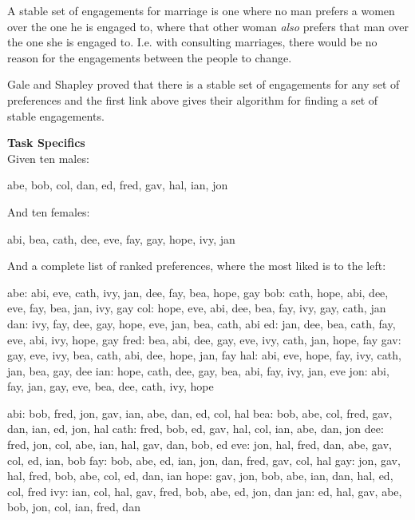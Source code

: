 \begin{itemize}
A stable set of engagements for marriage is one where no man prefers a
women over the one he is engaged to, where that other woman \emph{also}
prefers that man over the one she is engaged to. I.e. with consulting
marriages, there would be no reason for the engagements between the
people to change.

Gale and Shapley proved that there is a stable set of engagements for
any set of preferences and the first link above gives their algorithm
for finding a set of stable engagements.

\pagebreak{}
\textbf{Task Specifics}\\ Given ten males:

\begin{wideverbatim}
   abe, bob, col, dan, ed, fred, gav, hal, ian, jon
\end{wideverbatim}

And ten females:

\begin{wideverbatim}
   abi, bea, cath, dee, eve, fay, gay, hope, ivy, jan
\end{wideverbatim}

And a complete list of ranked preferences, where the most liked is to
the left:

\begin{wideverbatim}
  abe: abi, eve, cath, ivy, jan, dee, fay, bea, hope, gay
  bob: cath, hope, abi, dee, eve, fay, bea, jan, ivy, gay
  col: hope, eve, abi, dee, bea, fay, ivy, gay, cath, jan
  dan: ivy, fay, dee, gay, hope, eve, jan, bea, cath, abi
   ed: jan, dee, bea, cath, fay, eve, abi, ivy, hope, gay
 fred: bea, abi, dee, gay, eve, ivy, cath, jan, hope, fay
  gav: gay, eve, ivy, bea, cath, abi, dee, hope, jan, fay
  hal: abi, eve, hope, fay, ivy, cath, jan, bea, gay, dee
  ian: hope, cath, dee, gay, bea, abi, fay, ivy, jan, eve
  jon: abi, fay, jan, gay, eve, bea, dee, cath, ivy, hope
   
  abi: bob, fred, jon, gav, ian, abe, dan, ed, col, hal
  bea: bob, abe, col, fred, gav, dan, ian, ed, jon, hal
 cath: fred, bob, ed, gav, hal, col, ian, abe, dan, jon
  dee: fred, jon, col, abe, ian, hal, gav, dan, bob, ed
  eve: jon, hal, fred, dan, abe, gav, col, ed, ian, bob
  fay: bob, abe, ed, ian, jon, dan, fred, gav, col, hal
  gay: jon, gav, hal, fred, bob, abe, col, ed, dan, ian
 hope: gav, jon, bob, abe, ian, dan, hal, ed, col, fred
  ivy: ian, col, hal, gav, fred, bob, abe, ed, jon, dan
  jan: ed, hal, gav, abe, bob, jon, col, ian, fred, dan
\end{wideverbatim}


\end{itemize}
